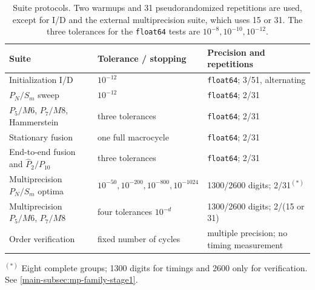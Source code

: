 \begin{table}[htbp]
\centering\small
\caption{Suite protocols. Two warmups and 31 pseudorandomized repetitions are used, except for I/D and the external multiprecision suite, which uses 15 or 31. The three tolerances for the \texttt{float64} tests are $10^{-8},10^{-10},10^{-12}$.}\label{tab:precision-regimes}
\begin{tabularx}{\textwidth}{Xll}
\toprule
Suite & Tolerance / stopping & Precision and repetitions\\\midrule
Initialization I/D & $10^{-12}$ & \texttt{float64}; 3/51, alternating\\
$P_N/S_m$ sweep & $10^{-12}$ & \texttt{float64}; 2/31\\
$P_5/M6$, $P_7/M8$, Hammerstein & three tolerances & \texttt{float64}; 2/31\\
Stationary fusion & one full macrocycle & \texttt{float64}; 2/31\\
End-to-end fusion and $\widehat P_2/P_{10}$ & three tolerances & \texttt{float64}; 2/31\\
Multiprecision $P_N/S_m$ optima & $10^{-50},10^{-200},10^{-800},10^{-1024}$ & 1300/2600 digits; 2/31$^{(*)}$\\
Multiprecision $P_5/M6$, $P_7/M8$ & four tolerances $10^{-d}$ & 1300/2600 digits; 2/(15 or 31)\\
Order verification & fixed number of cycles & multiple precision; no timing measurement\\
\bottomrule\end{tabularx}
\par\smallskip\footnotesize $^{(*)}$ Eight complete groups; 1300 digits for timings and 2600 only for verification. See \cref{main-subsec:mp-family-stage1}.
\end{table}